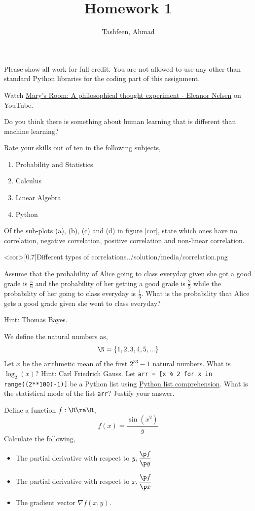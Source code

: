 \documentclass{homework}
\author{Tashfeen, Ahmad}
\title{Homework 1}
\begin{document}
 \maketitle

Please show all work for full credit.  You are not allowed to use any other than standard Python libraries for the coding part of this assignment.

\question Watch \href{https://www.youtube.com/watch?v=mGYmiQkah4o}{Mary's Room: A philosophical thought experiment - Eleanor Nelsen} on YouTube.

Do you think there is something about human learning that is different than machine learning?

\question Rate your skills out of ten in the following subjects,
\begin{enumerate}
  \item Probability and Statistics
  \item Calculus
  \item Linear Algebra
  \item Python
\end{enumerate}

\question Of the sub-plots (a), (b), (c) and (d) in figure \ref{cor}, state which ones have no correlation, negative correlation, positive correlation and non-linear correlation.

\img<cor>[0.7]{Different types of correlations.}{./solution/media/correlation.png}

\question Assume that the probability of Alice going to class everyday given she got a good grade is $\frac{5}{6}$ and the probability of her getting a good grade is $\frac{2}{5}$ while the probability of her going to class everyday is $\frac{1}{3}$. What is the probability that Alice gets a good grade given she went to class everyday?

Hint: Thomas Bayes.

\question We define the natural numbers as,
\[
  \N = \{1, 2, 3, 4, 5, ...\}
\]
Let $x$ be the arithmetic mean of the first $2^{33}-1$ natural numbers. What is $\log_2(x)$? Hint: Carl Friedrich Gauss.
\question Let \texttt{arr = [x \% 2 for x in range((2**100)-1)]} be a Python list using \href{https://www.w3schools.com/python/python_lists_comprehension.asp}{Python list comprehension}. What is the statistical mode of the list \texttt{arr}? Justify your answer.

\question Define a function $f:\R\ra\R$,
\[
  f(x) = \frac{\sin(x^2)}{y}
\]
Calculate the following,
\begin{itemize}
  \item The partial derivative with respect to $y, \displaystyle\frac{\p f}{\p y}$
  \item The partial derivative with respect to $x, \displaystyle\frac{\p f}{\p x}$
  \item The gradient vector $\nabla f(x, y)$.
\end{itemize}
\end{document}
